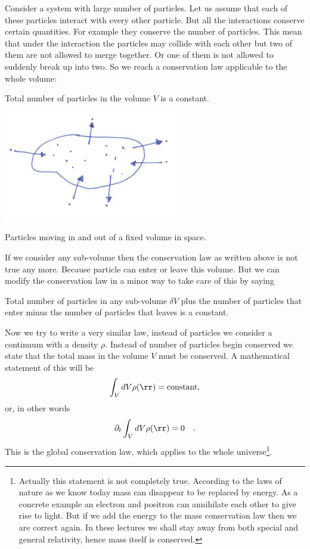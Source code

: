 Consider a system with large number of particles.
Let us assume that each of these particles interact with every other
particle. But all the interactions conserve certain quantities. For
example they conserve the number of particles. This mean that under
the interaction the particles may collide with each other but two of
them are not allowed to merge together. Or one of them is not allowed
to suddenly break up into two. 
 So we reach a conservation law
applicable to the whole volume:
\begin{gcon}
Total number of particles in the volume $V$ is a constant.  
\end{gcon}
\begin{marginfigure}
\includegraphics{figures/jj.png}
\caption{Particles moving in and out of a fixed volume in space.}
\label{fig:jj}
\end{marginfigure}
If we consider any sub-volume  then the conservation law 
as written above is not true any more.  Because particle can enter or
leave this volume. But we can modify the conservation law in a minor
way to take care of this by saying
\begin{lcon}
Total number of particles in any sub-volume $\delta V$ plus the number
of particles that enter minus the number of particles that leaves is a
constant.  
\end{lcon}
Now we try to write a very similar law, instead of particles we
consider a continuum with a density $\rho$. Instead of number of
particles begin conserved we state that the total mass in the volume
$V$ must be conserved. A mathematical statement of this will be
\begin{equation}
\int_V dV \rho(\rr) = \text{constant} \/,
\end{equation}
or, in other words
\begin{equation}
\partial_t\int_V dV \rho(\rr) = 0 \/\quad.
\label{A2.1:gmass}
\end{equation}
This is the global conservation law, which applies to the whole
universe\footnote{Actually this statement is not completely
  true. According to the laws of nature as we know today mass can
  disappear to be replaced by energy. As a concrete example an
  electron and positron can annihilate each other to give rise to
  light. But if we add the energy to the mass conservation law then we
  are correct again.  In these lectures we shall stay away from both
  special and general relativity, hence mass itself is conserved. }.
